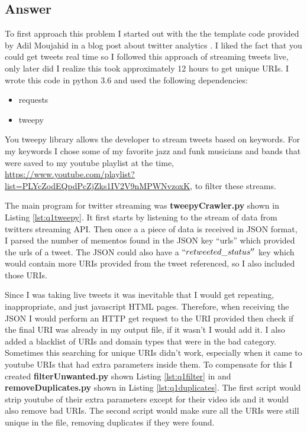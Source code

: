 \documentclass[letterpaper,11pt]{article}
\newcommand*{\srcPath}{../src}%
\begin{document}
\subsection*{Answer}

To first approach this problem I started out with the the template code provided by Adil Moujahid in a blog post about twitter analytics \cite{twitterstreamref}. I liked the fact that you could get tweets real time so I followed this approach of streaming tweets live, only later did I realize this took approximately 12 hours to get unique URIs. I wrote this code in python 3.6 and used the following dependencies:

\begin{itemize}
  \item requests
  \item tweepy
\end{itemize}

You tweepy library allows the developer to stream tweets based on keywords. For my keywords I chose some of my favorite jazz and funk musicians and bands that were saved to my youtube playlist at the time, \url{https://www.youtube.com/playlist?list=PLYcZodEQpdPcZjZks1IV2V9nMPWNvzoxK}, to filter these streams.

The main program for twitter streaming was \textbf{tweepyCrawler.py} shown in Listing \ref{lst:q1tweepy}. It first starts by listening to the stream of data from twitters streaming API. Then once a a piece of data is received in JSON format, I parsed the number of mementos found in the JSON key ``urls'' which provided the urls of a tweet. The JSON could also have a $``retweeted\char`_status''$ key which would contain more URIs provided from the tweet referenced, so I also included those URIs.



Since I was taking live tweets it was inevitable that I would get repeating, inappropriate, and just javascript HTML pages. Therefore, when receiving the JSON I would perform an HTTP get request to the URI provided then check if the final URI was already in my output file, if it wasn't I would add it. I also added a blacklist of URIs and domain types that were in the bad category. Sometimes this searching for unique URIs didn't work, especially when it came to youtube URIs that had extra parameters inside them. To compensate for this I created \textbf{filterUnwanted.py} shown Listing \ref{lst:q1filter} in and \textbf{removeDuplicates.py} shown in Listing \ref{lst:q1duplicates}. The first script would strip youtube of their extra parameters except for their video ids and it would also remove bad URIs. The second script would make sure all the URIs were still unique in the file, removing duplicates if they were found.
\end{document}
